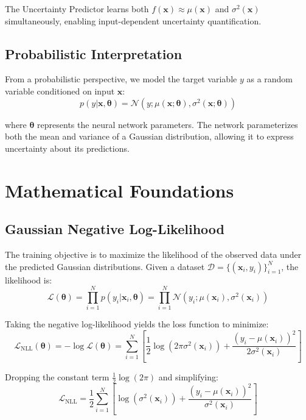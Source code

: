 \documentclass[11pt,a4paper]{article}
\begin{document}
The Uncertainty Predictor learns both $f(\mathbf{x}) \approx \mu(\mathbf{x})$ and $\sigma^2(\mathbf{x})$ simultaneously, enabling input-dependent uncertainty quantification.

\subsection{Probabilistic Interpretation}

From a probabilistic perspective, we model the target variable $y$ as a random variable conditioned on input $\mathbf{x}$:
\begin{equation}
p(y|\mathbf{x}, \boldsymbol{\theta}) = \mathcal{N}(y; \mu(\mathbf{x}; \boldsymbol{\theta}), \sigma^2(\mathbf{x}; \boldsymbol{\theta}))
\end{equation}

where $\boldsymbol{\theta}$ represents the neural network parameters. The network parameterizes both the mean and variance of a Gaussian distribution, allowing it to express uncertainty about its predictions.

\section{Mathematical Foundations}

\subsection{Gaussian Negative Log-Likelihood}

The training objective is to maximize the likelihood of the observed data under the predicted Gaussian distributions. Given a dataset $\mathcal{D} = \{(\mathbf{x}_i, y_i)\}_{i=1}^N$, the likelihood is:
\begin{equation}
\mathcal{L}(\boldsymbol{\theta}) = \prod_{i=1}^N p(y_i|\mathbf{x}_i, \boldsymbol{\theta}) = \prod_{i=1}^N \mathcal{N}(y_i; \mu(\mathbf{x}_i), \sigma^2(\mathbf{x}_i))
\end{equation}

Taking the negative log-likelihood yields the loss function to minimize:
\begin{equation}
\mathcal{L}_{\text{NLL}}(\boldsymbol{\theta}) = -\log \mathcal{L}(\boldsymbol{\theta}) = \sum_{i=1}^N \left[ \frac{1}{2}\log(2\pi\sigma^2(\mathbf{x}_i)) + \frac{(y_i - \mu(\mathbf{x}_i))^2}{2\sigma^2(\mathbf{x}_i)} \right]
\end{equation}

Dropping the constant term $\frac{1}{2}\log(2\pi)$ and simplifying:
\begin{equation}
\boxed{\mathcal{L}_{\text{NLL}} = \frac{1}{2}\sum_{i=1}^N \left[ \log(\sigma^2(\mathbf{x}_i)) + \frac{(y_i - \mu(\mathbf{x}_i))^2}{\sigma^2(\mathbf{x}_i)} \right]}
\end{equation}
\end{document}
